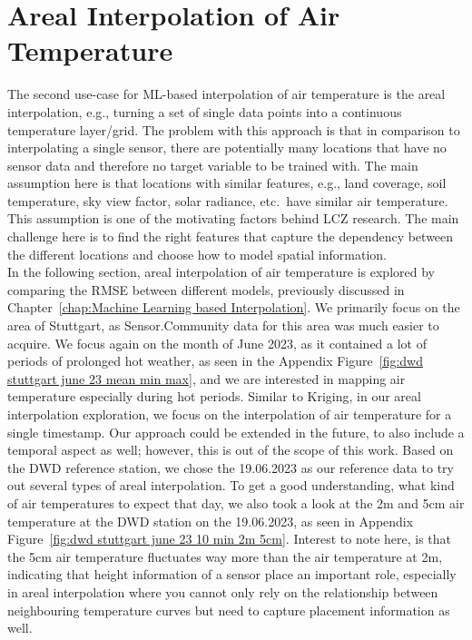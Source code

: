 \section{Areal Interpolation of Air Temperature}

The second use-case for ML-based interpolation of air temperature is the areal interpolation, e.g., turning a set of single data points into a continuous temperature layer/grid. The problem with this approach is that in comparison to interpolating a single sensor, there are potentially many locations that have no sensor data and therefore no target variable to be trained with. The main assumption here is that locations with similar features, e.g., land coverage, soil temperature, sky view factor, solar radiance, etc.\ have similar air temperature. This assumption is one of the motivating factors behind LCZ research. The main challenge here is to find the right features that capture the dependency between the different locations and choose how to model spatial information.\\
In the following section, areal interpolation of air temperature is explored by comparing the RMSE between different models, previously discussed in Chapter~\ref{chap:Machine Learning based Interpolation}. We primarily focus on the area of Stuttgart, as Sensor.Community data for this area was much easier to acquire. We focus again on the month of June 2023, as it contained a lot of periods of prolonged hot weather, as seen in the Appendix Figure~\ref{fig:dwd stuttgart june 23 mean min max}, and we are interested in mapping air temperature especially during hot periods. Similar to Kriging, in our areal interpolation exploration, we focus on the interpolation of air temperature for a single timestamp. Our approach could be extended in the future, to also include a temporal aspect as well; however, this is out of the scope of this work. Based on the DWD reference station, we chose the 19.06.2023 as our reference data to try out several types of areal interpolation. To get a good understanding, what kind of air temperatures to expect that day, we also took a look at the 2m and 5cm air temperature at the DWD station on the 19.06.2023, as seen in Appendix Figure~\ref{fig:dwd stuttgart june 23 10 min 2m 5cm}. Interest to note here, is that the 5cm air temperature fluctuates way more than the air temperature at 2m, indicating that height information of a sensor place an important role, especially in areal interpolation where you cannot only rely on the relationship between neighbouring temperature curves but need to capture placement information as well.

